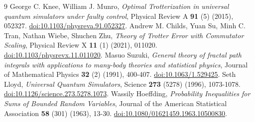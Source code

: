 \begin{thebibliography}{9}
 George C. Knee, William J. Munro, \emph{Optimal Trotterization in universal quantum simulators under faulty control}, Physical Review A \textbf{91} (5) (2015), 052327. \href{https://doi.org/10.1103/physreva.91.052327}{doi:10.1103/physreva.91.052327}.
 Andrew M. Childs, Yuan Su, Minh C. Tran, Nathan Wiebe, Shuchen Zhu, \emph{Theory of Trotter Error with Commutator Scaling}, Physical Review X \textbf{11} (1) (2021), 011020. \href{https://doi.org/10.1103/physrevx.11.011020}{doi:10.1103/physrevx.11.011020}.
 Masuo Suzuki, \emph{General theory of fractal path integrals with applications to many-body theories and statistical physics}, Journal of Mathematical Physics \textbf{32} (2) (1991), 400-407. \href{https://doi.org/10.1063/1.529425}{doi:10.1063/1.529425}.
 Seth Lloyd, \emph{Universal Quantum Simulators}, Science \textbf{273} (5278) (1996), 1073-1078. \href{https://doi.org/10.1126/science.273.5278.1073}{doi:10.1126/science.273.5278.1073}.
 Wassily Hoeffding, \emph{Probability Inequalities for Sums of Bounded Random Variables}, Journal of the American Statistical Association \textbf{58} (301) (1963), 13-30. \href{https://doi.org/10.1080/01621459.1963.10500830}{doi:10.1080/01621459.1963.10500830}.
\end{thebibliography}

